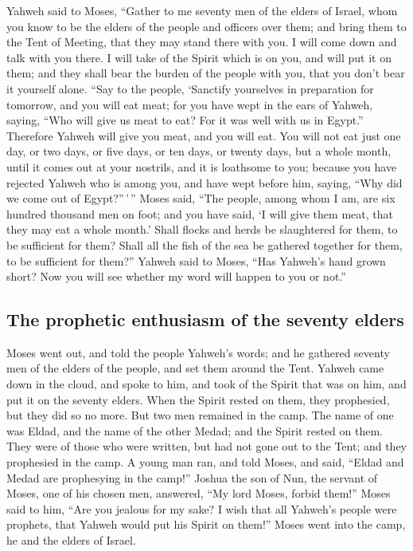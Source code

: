  Yahweh said to Moses, ``Gather to me seventy men of the
elders of Israel, whom you know to be the elders of the people and
officers over them; and bring them to the Tent of Meeting, that they may
stand there with you.  I will come down and talk with you
there. I will take of the Spirit which is on you, and will put it on
them; and they shall bear the burden of the people with you, that you
don't bear it yourself alone.  ``Say to the people,
`Sanctify yourselves in preparation for tomorrow, and you will eat meat;
for you have wept in the ears of Yahweh, saying, ``Who will give us meat
to eat? For it was well with us in Egypt.'' Therefore Yahweh will give
you meat, and you will eat.  You will not eat just one
day, or two days, or five days, or ten days, or twenty days,
 but a whole month, until it comes out at your nostrils,
and it is loathsome to you; because you have rejected Yahweh who is
among you, and have wept before him, saying, ``Why did we come out of
Egypt?''\,'\,''  Moses said, ``The people, among whom I
am, are six hundred thousand men on foot; and you have said, `I will
give them meat, that they may eat a whole month.'  Shall
flocks and herds be slaughtered for them, to be sufficient for them?
Shall all the fish of the sea be gathered together for them, to be
sufficient for them?''  Yahweh said to Moses, ``Has
Yahweh's hand grown short? Now you will see whether my word will happen
to you or not.''

\hypertarget{the-prophetic-enthusiasm-of-the-seventy-elders}{%
\subsection{The prophetic enthusiasm of the seventy
elders}\label{the-prophetic-enthusiasm-of-the-seventy-elders}}

 Moses went out, and told the people Yahweh's words; and
he gathered seventy men of the elders of the people, and set them around
the Tent.  Yahweh came down in the cloud, and spoke to
him, and took of the Spirit that was on him, and put it on the seventy
elders. When the Spirit rested on them, they prophesied, but they did so
no more.  But two men remained in the camp. The name of
one was Eldad, and the name of the other Medad; and the Spirit rested on
them. They were of those who were written, but had not gone out to the
Tent; and they prophesied in the camp.  A young man ran,
and told Moses, and said, ``Eldad and Medad are prophesying in the
camp!''  Joshua the son of Nun, the servant of Moses, one
of his chosen men, answered, ``My lord Moses, forbid them!''
 Moses said to him, ``Are you jealous for my sake? I wish
that all Yahweh's people were prophets, that Yahweh would put his Spirit
on them!''  Moses went into the camp, he and the elders
of Israel.

